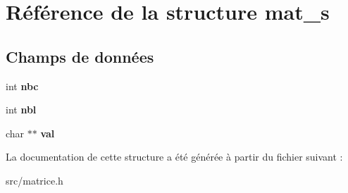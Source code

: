 \hypertarget{structmat__s}{}\section{Référence de la structure mat\+\_\+s}
\label{structmat__s}
\subsection*{Champs de données}
\begin{DoxyCompactItemize}
\item 
int {\bfseries nbc}\hypertarget{structmat__s_ae42929290738ae9582f3d72273b848de}{}\label{structmat__s_ae42929290738ae9582f3d72273b848de}

\item 
int {\bfseries nbl}\hypertarget{structmat__s_ad7880699540a3f2e94ed3ee7d5d3b320}{}\label{structmat__s_ad7880699540a3f2e94ed3ee7d5d3b320}

\item 
char $\ast$$\ast$ {\bfseries val}\hypertarget{structmat__s_a7a5b5d01a515e56fa0fb940202153cd1}{}\label{structmat__s_a7a5b5d01a515e56fa0fb940202153cd1}

\end{DoxyCompactItemize}


La documentation de cette structure a été générée à partir du fichier suivant \+:\begin{DoxyCompactItemize}
\item 
src/matrice.\+h\end{DoxyCompactItemize}
